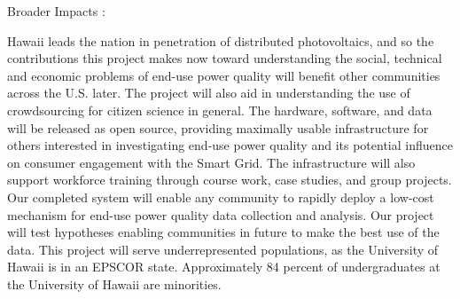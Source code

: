 Broader Impacts :

Hawaii leads the nation in penetration of distributed photovoltaics, and so the contributions
this project makes now toward understanding the social, technical and economic problems of
end-use power quality will benefit other communities across the U.S. later. The project will
also aid in understanding the use of crowdsourcing for citizen science in general. The hardware,
software, and data will be released as open source, providing maximally usable infrastructure
for others interested in investigating end-use power quality and its potential influence on
consumer engagement with the Smart Grid. The infrastructure will also support workforce training
through course work, case studies, and group projects.
Our completed system will enable any community to rapidly deploy a low-cost mechanism for
end-use power quality data collection and analysis. Our project will test hypotheses enabling
communities in future to make the best use of the data.
This project will serve underrepresented populations, as the University of Hawaii is in an
EPSCOR state. Approximately 84 percent of undergraduates at the University of Hawaii are minorities.
